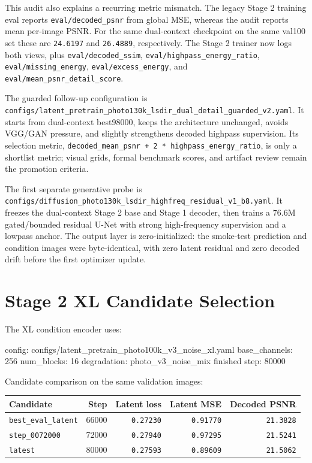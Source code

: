 \documentclass[
  10pt,
]{article}
\newenvironment{Shaded}{}{}
\newcommand{\NormalTok}[1]{#1}
\begin{document}
This audit also explains a recurring metric mismatch. The legacy Stage 2
training eval reports \texttt{eval/decoded\_psnr} from global MSE,
whereas the audit reports mean per-image PSNR. For the same dual-context
checkpoint on the same val100 set these are \texttt{24.6197} and
\texttt{26.4889}, respectively. The Stage 2 trainer now logs both views,
plus \texttt{eval/decoded\_ssim}, \texttt{eval/highpass\_energy\_ratio},
\texttt{eval/missing\_energy}, \texttt{eval/excess\_energy}, and
\texttt{eval/mean\_psnr\_detail\_score}.

The guarded follow-up configuration is
\texttt{configs/latent\_pretrain\_photo130k\_lsdir\_dual\_detail\_guarded\_v2.yaml}.
It starts from dual-context best98000, keeps the architecture unchanged,
avoids VGG/GAN pressure, and slightly strengthens decoded highpass
supervision. Its selection metric,
\texttt{decoded\_mean\_psnr\ +\ 2\ *\ highpass\_energy\_ratio}, is only
a shortlist metric; visual grids, formal benchmark scores, and artifact
review remain the promotion criteria.

The first separate generative probe is
\texttt{configs/diffusion\_photo130k\_lsdir\_highfreq\_residual\_v1\_b8.yaml}.
It freezes the dual-context Stage 2 base and Stage 1 decoder, then
trains a 76.6M gated/bounded residual U-Net with strong high-frequency
supervision and a lowpass anchor. The output layer is zero-initialized:
the smoke-test prediction and condition images were byte-identical, with
zero latent residual and zero decoded drift before the first optimizer
update.

\hypertarget{stage-2-xl-candidate-selection}{%
\section{Stage 2 XL Candidate
Selection}\label{stage-2-xl-candidate-selection}}

The XL condition encoder uses:

\begin{Shaded}
\begin{Highlighting}[]
\NormalTok{config: configs/latent\_pretrain\_photo100k\_v3\_noise\_xl.yaml}
\NormalTok{base\_channels: 256}
\NormalTok{num\_blocks: 16}
\NormalTok{degradation: photo\_v3\_noise\_mix}
\NormalTok{finished step: 80000}
\end{Highlighting}
\end{Shaded}

Candidate comparison on the same validation images:

\begin{longtable}[]{@{}lrrrr@{}}
\toprule\noalign{}
Candidate & Step & Latent loss & Latent MSE & Decoded PSNR \\
\midrule\noalign{}
\endhead
\bottomrule\noalign{}
\endlastfoot
\texttt{best\_eval\_latent} & 66000 & \texttt{0.27230} &
\texttt{0.91770} & \texttt{21.3828} \\
\texttt{step\_0072000} & 72000 & \texttt{0.27940} & \texttt{0.97295} &
\texttt{21.5241} \\
\texttt{latest} & 80000 & \texttt{0.27593} & \texttt{0.89609} &
\texttt{21.5062} \\
\end{longtable}
\end{document}
